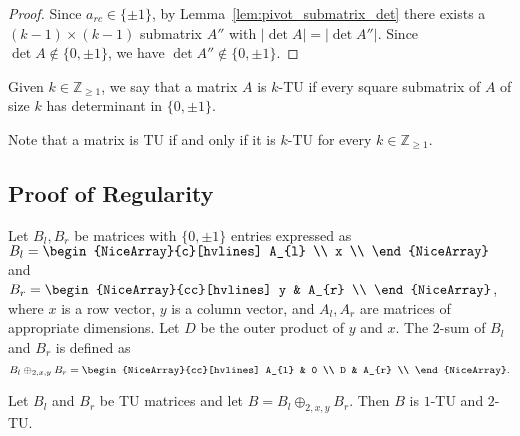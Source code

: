 \begin{proof}
    Since $a_{rc} \in \{\pm 1\}$, by Lemma~\ref{lem:pivot_submatrix_det} there exists a $(k - 1) \times (k - 1)$ submatrix $A''$ with $|\det A| = |\det A''|$. Since $\det A \notin \{0, \pm 1\}$, we have $\det A'' \notin \{0, \pm 1\}$.
\end{proof}

\begin{definition}\label{def:k_tu}
    Given $k \in \mathbb{Z}_{\geq 1}$, we say that a matrix $A$ is $k$-TU if every square submatrix of $A$ of size $k$ has determinant in $\{0, \pm 1\}$.
\end{definition}

\begin{remark}
    Note that a matrix is TU if and only if it is $k$-TU for every $k \in \mathbb{Z}_{\geq 1}$.
\end{remark}


\subsection{Proof of Regularity}

\begin{definition}\label{def:two_sum}
    Let $B_{l}, B_{r}$ be matrices with $\{0, \pm 1\}$ entries expressed as $B_{l} = \begin{NiceArray}{c}[hvlines] A_{l} \\ x \\ \end{NiceArray}$ and $B_{r} = \begin{NiceArray}{cc}[hvlines] y & A_{r} \\ \end{NiceArray}$, where $x$ is a row vector, $y$ is a column vector, and $A_{l}, A_{r}$ are matrices of appropriate dimensions. Let $D$ be the outer product of $y$ and $x$. The $2$-sum of $B_{l}$ and $B_{r}$ is defined as
    \[
        B_{l} \oplus_{2, x, y} B_{r} = \begin{NiceArray}{cc}[hvlines] A_{l} & 0 \\ D & A_{r} \\ \end{NiceArray}.
    \]
\end{definition}

\begin{lemma}\label{lem:two_sum_1_2_tu}
    Let $B_{l}$ and $B_{r}$ be TU matrices and let $B = B_{l} \oplus_{2, x, y} B_{r}$. Then $B$ is $1$-TU and $2$-TU.
\end{lemma}

